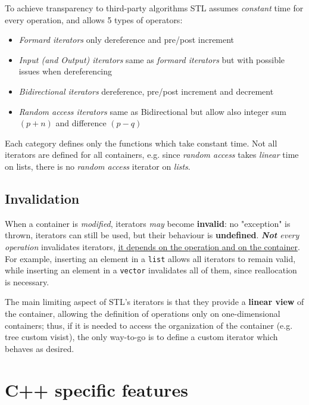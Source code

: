 To achieve transparency to third-party algorithms STL assumes \textit{constant} time for every operation, and allows 5 types of operators:
\begin{itemize}
  \item \textit{Formard iterators} only dereference and pre/post increment
  \item \textit{Input (and Output) iterators} same as \textit{formard iterators} but with possible issues when dereferencing
  \item \textit{Bidirectional iterators} dereference, pre/post increment and decrement
  \item \textit{Random access iterators} same as Bidirectional but allow also integer sum $(p + n)$ and difference $(p - q)$
\end{itemize}
Each category defines only the functions which take constant time. Not all iterators are defined for all
containers, e.g. since \textit{random access} takes \textit{linear} time on lists,
there is no \textit{random access} iterator on \textit{lists}.

\subsection{Invalidation}
When a container is \textit{modified},
iterators \textit{may} become \textbf{invalid}:
no "exception" is thrown,
iterators can still be used,
but their behaviour is \textbf{undefined}.
\textit{\textbf{Not} every operation} invalidates iterators,
\ul{it depends on the operation and on the container}.
For example, inserting an element in a \lstinline|list| allows all iterators to remain valid, while inserting an element in a \lstinline|vector| invalidates all of them, since reallocation is necessary.
\nl

The main limiting aspect of STL's iterators is that they provide a \textbf{linear view} of the container,
allowing the definition of operations only on one-dimensional containers;
thus, if it is needed to access the organization of the container (e.g. tree custom visist), the only way-to-go is to define a custom iterator which behaves as desired.

\section{C++ specific features}

